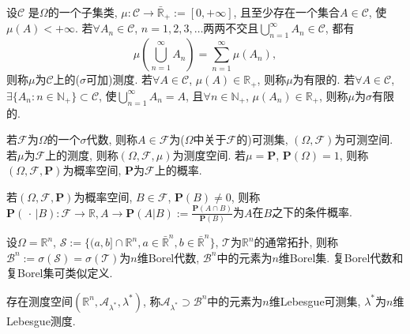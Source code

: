 \begin{definition}
    设$\mathcal{C}$ 是$\Omega$的一个子集类, $\mu:\mathcal{C}\to\bar{\mathbb{R} }_+:=[0,+\infty]$, 且至少存在一个集合$A\in\mathcal{C}$, 使$\mu(A)<+\infty$. 若$\forall A_n\in\mathcal{C}$, $n=1,2,3,\dots$两两不交且$\bigcup_{n=1}^{\infty}A_n\in\mathcal{C}$, 都有\begin{equation*}
        \mu\left(\bigcup_{n=1}^{\infty}A_n\right)=\sum_{n=1}^{\infty}\mu\left(A_n\right),
    \end{equation*}则称$\mu$为$\mathcal{C}$上的($\sigma$可加)测度. 若$\forall A\in\mathcal{C}$, $\mu(A)\in\mathbb{R}_+$, 则称$\mu$为有限的. 若$\forall A\in\mathcal{C}$, $\exists\{A_n:n\in\mathbb{N}_+\}\subset\mathcal{C} $, 使$\bigcup_{n=1}^{\infty}A_n=A$, 且$\forall n\in\mathbb{N}_+$, $\mu(A_n)\in\mathbb{R}_+$, 则称$\mu$为$\sigma$有限的. 
\end{definition}

\begin{definition}
    若$\mathcal{F}$为$\Omega$的一个$\sigma$代数, 则称$A\in\mathcal{F}$为($\Omega$中关于$\mathcal{F}$的)可测集, $(\Omega,\mathcal{F})$为可测空间. 若$\mu$为$\mathcal{F}$上的测度, 则称$(\Omega,\mathcal{F},\mu)$为测度空间. 若$\mu=\mathbf{P}$, $\mathbf{P}(\Omega)=1$, 则称$(\Omega,\mathcal{F},\mathbf{P})$为概率空间, $\mathbf{P}$为$\mathcal{F}$上的概率.
\end{definition}

\begin{definition}
    若$(\Omega,\mathcal{F},\mathbf{P})$为概率空间, $B\in\mathcal{F}$, $\mathbf{P}(B)\ne 0$, 则称$\mathbf{P}(\,\cdot\,|B):\mathcal{F}\to\mathbb{R}, A\to\mathbf{P}(A|B):=\frac{\mathbf{P}(A\cap B)}{\mathbf{P}(B)}$为$A$在$B$之下的条件概率.
\end{definition}

\begin{definition}
    设$\Omega=\mathbb{R}^n$, $\mathscr{S}:=\{(a,b]\cap\mathbb{R}^n,a\in\bar{\mathbb{R}}^n,b\in\bar{\mathbb{R}}^n\}$, $\mathscr{T}$为$\mathbb{R}^n$的通常拓扑, 则称$\mathscr{B}^n:=\sigma(\mathscr{S})=\sigma(\mathscr{T})$为$n$维Borel代数, $\mathscr{B}^n$中的元素为$n$维Borel集. 复Borel代数和复Borel集可类似定义.
\end{definition}

\begin{definition}
    存在测度空间$(\mathbb{R}^n,\mathscr{A}_{\lambda^*},\lambda^*)$, 称$\mathscr{A}_{\lambda^*}\!\!\supset\!\!\mathscr{B}^n$中的元素为$n$维Lebesgue可测集, $\lambda^*$为$n$维Lebesgue测度.
\end{definition}
